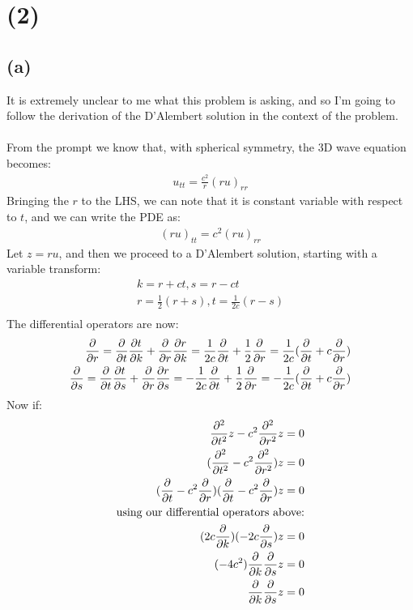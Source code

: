 \documentclass{article}
\begin{document}
\section*{\textbf{(2)}}
\subsection*{\textbf{(a)}}
It is extremely unclear to me what this problem is asking, and so I'm going to follow the derivation of the D'Alembert solution in the context of the problem.\\
\\
From the prompt we know that, with spherical symmetry, the 3D wave equation becomes:
\begin{equation}
\begin{aligned}
u_{tt} = \frac{c^2}{r}(ru)_{rr}
\end{aligned}
\end{equation}
Bringing the $r$ to the LHS, we can note that it is constant variable with respect to $t$, and we can write the PDE as:
\begin{equation}
\begin{aligned}
(ru)_{tt} = c^2(ru)_{rr}
\end{aligned}
\end{equation}
Let $z = ru$, and then we proceed to a D'Alembert solution, starting with a variable transform:
\begin{equation}
\begin{aligned}
k = r+ct, s = r-ct\\
r= \frac{1}{2}(r+s), t = \frac{1}{2c}(r - s)\\
\end{aligned}
\end{equation}
The differential operators are now:
\begin{equation}
\begin{aligned}
\pdv{}{r} = \pdv{}{t}\pdv{t}{k} + \pdv{}{r}\pdv{r}{k} = \frac{1}{2c}\pdv{}{t} + \frac{1}{2}\pdv{}{r} = \frac{1}{2c}(\pdv{}{t} + c\pdv{}{r})\\
\pdv{}{s} = \pdv{}{t}\pdv{t}{s} + \pdv{}{r}\pdv{r}{s} = -\frac{1}{2c}\pdv{}{t} + \frac{1}{2}\pdv{}{r} = -\frac{1}{2c}(\pdv{}{t} + c\pdv{}{r})\\
\end{aligned}
\end{equation}
Now if:
\begin{equation}
\begin{aligned}
\pdv[2]{}{t}z -c^2\pdv[2]{}{r}z = 0\\
(\pdv[2]{}{t} - c^2 \pdv[2]{}{r})z = 0\\
(\pdv{}{t} - c^2 \pdv{}{r})(\pdv{}{t} - c^2 \pdv{}{r})z = 0\\
\text{using our differential operators above:}\\
(2c \pdv{}{k})(-2c\pdv{}{s})z = 0\\
(-4c^2)\pdv{}{k}\pdv{}{s}z = 0\\
\pdv{}{k}\pdv{}{s}z = 0\\
\end{aligned}
\end{equation}
\end{document}
